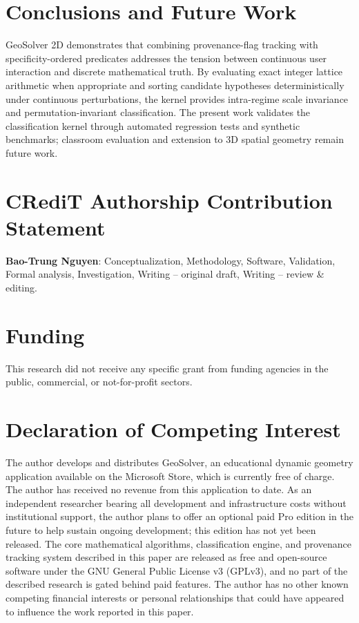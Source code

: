 \documentclass[preprint,12pt]{elsarticle}
\begin{document}
\section{Conclusions and Future Work}
GeoSolver 2D demonstrates that combining provenance-flag tracking with specificity-ordered predicates addresses the tension between continuous user interaction and discrete mathematical truth. By evaluating exact integer lattice arithmetic when appropriate and sorting candidate hypotheses deterministically under continuous perturbations, the kernel provides intra-regime scale invariance and permutation-invariant classification. The present work validates the classification kernel through automated regression tests and synthetic benchmarks; classroom evaluation and extension to 3D spatial geometry remain future work.

\section*{CRediT Authorship Contribution Statement}
\textbf{Bao-Trung Nguyen}: Conceptualization, Methodology, Software, Validation, Formal analysis, Investigation, Writing -- original draft, Writing -- review \& editing.

\section*{Funding}
This research did not receive any specific grant from funding agencies in the public, commercial, or not-for-profit sectors.

\section*{Declaration of Competing Interest}
The author develops and distributes GeoSolver, an educational dynamic geometry application available on the Microsoft Store, which is currently free of charge. The author has received no revenue from this application to date. As an independent researcher bearing all development and infrastructure costs without institutional support, the author plans to offer an optional paid Pro edition in the future to help sustain ongoing development; this edition has not yet been released. The core mathematical algorithms, classification engine, and provenance tracking system described in this paper are released as free and open-source software under the GNU General Public License v3 (GPLv3), and no part of the described research is gated behind paid features. The author has no other known competing financial interests or personal relationships that could have appeared to influence the work reported in this paper.
\end{document}
